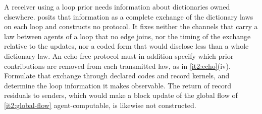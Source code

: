 A receiver using a loop prior needs information about dictionaries owned elsewhere.  posits that information as a complete exchange of the dictionary laws on each loop and constructs no protocol. It fixes neither the channels that carry a law between agents of a loop that no edge joins, nor the timing of the exchange relative to the updates, nor a coded form that would disclose less than a whole dictionary law. An echo-free protocol must in addition specify which prior contributions are removed from each transmitted law, as in \cref{it2:echo}(iv). Formulate that exchange through declared codes and record kernels, and determine the loop information it makes observable. The return of record residuals to senders, which would make a block update of the global flow of \cref{it2:global-flow} agent-computable, is likewise not constructed.
